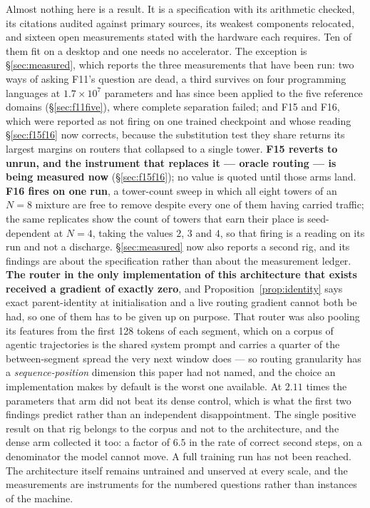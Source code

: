 \documentclass[11pt]{article}
\begin{document}
Almost nothing here is a result. It is a specification with its arithmetic checked, its citations audited against primary sources, its weakest components relocated, and sixteen open measurements stated with the hardware each requires. Ten of them fit on a desktop and one needs no accelerator. The exception is \S\ref{sec:measured}, which reports the three measurements that have been run: two ways of asking F11's question are dead, a third survives on four programming languages at $1.7\times10^{7}$ parameters and has since been applied to the five reference domains (\S\ref{sec:f11five}), where complete separation failed; and F15 and F16, which were reported as not firing on one trained checkpoint and whose reading \S\ref{sec:f15f16} now corrects, because the substitution test they share returns its largest margins on routers that collapsed to a single tower. \textbf{F15 reverts to unrun, and the instrument that replaces it --- oracle routing --- is being measured now} (\S\ref{sec:f15f16}); no value is quoted until those arms land. \textbf{F16 fires on one run}, a tower-count sweep in which all eight towers of an $N=8$ mixture are free to remove despite every one of them having carried traffic; the same replicates show the count of towers that earn their place is seed-dependent at $N=4$, taking the values $2$, $3$ and $4$, so that firing is a reading on its run and not a discharge. \S\ref{sec:measured} now also reports a second rig, and its findings are about the specification rather than about the measurement ledger. \textbf{The router in the only implementation of this architecture that exists received a gradient of exactly zero}, and Proposition~\ref{prop:identity} says exact parent-identity at initialisation and a live routing gradient cannot both be had, so one of them has to be given up on purpose. That router was also pooling its features from the first 128 tokens of each segment, which on a corpus of agentic trajectories is the shared system prompt and carries a quarter of the between-segment spread the very next window does --- so routing granularity has a \emph{sequence-position} dimension this paper had not named, and the choice an implementation makes by default is the worst one available. At $2.11$ times the parameters that arm did not beat its dense control, which is what the first two findings predict rather than an independent disappointment. The single positive result on that rig belongs to the corpus and not to the architecture, and the dense arm collected it too: a factor of $6.5$ in the rate of correct second steps, on a denominator the model cannot move. A full training run has not been reached. The architecture itself remains untrained and unserved at every scale, and the measurements are instruments for the numbered questions rather than instances of the machine.
\end{document}
